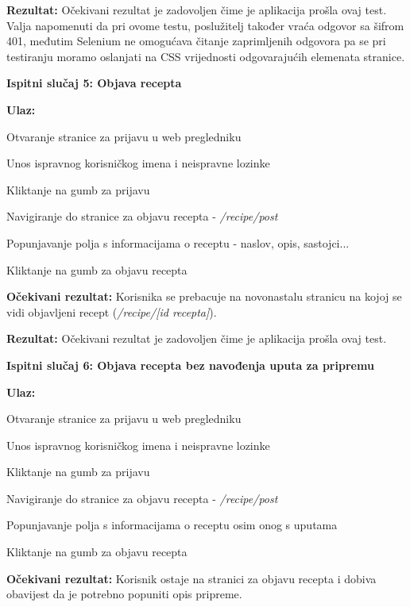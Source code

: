 			\noindent\textbf{Rezultat:} Očekivani rezultat je zadovoljen čime je aplikacija prošla ovaj test. Valja napomenuti da pri ovome testu, poslužitelj također vraća odgovor sa šifrom 401, međutim Selenium ne omogućava čitanje zaprimljenih odgovora pa se pri testiranju moramo oslanjati na CSS vrijednosti odgovarajućih elemenata stranice.\linebreak
			
			\noindent\textbf{Ispitni slučaj 5: Objava recepta}
			
			\noindent\textbf{Ulaz:}
			\begin{packed_enum}
				\item Otvaranje stranice za prijavu u web pregledniku
				\item Unos ispravnog korisničkog imena i neispravne lozinke
				\item Kliktanje na gumb za prijavu
				\item Navigiranje do stranice za objavu recepta - \textit{/recipe/post}
				\item Popunjavanje polja s informacijama o receptu - naslov, opis, sastojci...
				\item Kliktanje na gumb za objavu recepta
			\end{packed_enum}
 			\textbf{Očekivani rezultat:} Korisnika se prebacuje na novonastalu stranicu na kojoj se vidi objavljeni recept (\textit{/recipe/[id recepta]}).
			
			\noindent\textbf{Rezultat:} Očekivani rezultat je zadovoljen čime je aplikacija prošla ovaj test.\linebreak
			
			\noindent\textbf{Ispitni slučaj 6: Objava recepta bez navođenja uputa za pripremu}
			
			\noindent\textbf{Ulaz:}
			\begin{packed_enum}
				\item Otvaranje stranice za prijavu u web pregledniku
				\item Unos ispravnog korisničkog imena i neispravne lozinke
				\item Kliktanje na gumb za prijavu
				\item Navigiranje do stranice za objavu recepta - \textit{/recipe/post}
				\item Popunjavanje polja s informacijama o receptu osim onog s uputama
				\item Kliktanje na gumb za objavu recepta
			\end{packed_enum}
			\textbf{Očekivani rezultat:} Korisnik ostaje na stranici za objavu recepta i dobiva obavijest da je potrebno popuniti opis pripreme.
			

